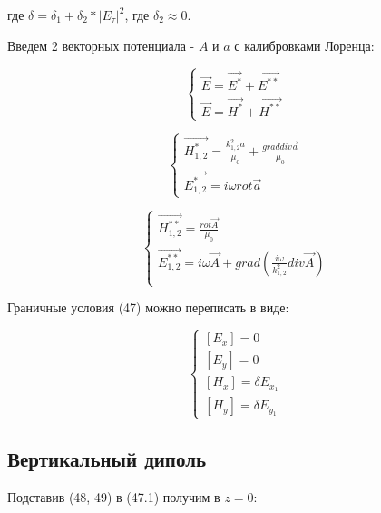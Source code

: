 	где $\delta = \delta_1 + \delta_2 * {|E_{\tau}|}^2$, где $\delta_2 \approx 0$.
	
	
	Введем 2 векторных потенциала - $A$ и $a$ с калибровками Лоренца:
	
	$$\begin{cases}
		\vec{E} = \vec{E^{*}} + \vec{E^{**}} \\
		\vec{E} = \vec{H^{*}} + \vec{H^{**}}
	\end{cases}$$
		
	\begin{equation}
		\begin{cases}
			\vec{H^*_{1, 2}} = \frac{k^2_{1, 2}a}{\mu_0} + \frac{grad div \vec{a}}{\mu_0}  \\
			\vec{E^*_{1, 2}} = i \omega rot \vec{a}
		\end{cases}
	\end{equation}
	
	\begin{equation}
		\begin{cases}
			\vec{H^{**}_{1, 2}} = \frac{rot \vec{A}}{\mu_0} \\
			\vec{E^{**}_{1, 2}} = i \omega \vec{A} + grad(\frac{i \omega}{k^2_{1, 2}} div \vec{A}) \\
		\end{cases}
	\end{equation}
	
	Граничные условия (47) можно переписать в виде:
	
	\begin{equation*}
		\tag{47.1}
		\begin{cases}
			[E_x] = 0 \\
			[E_y] = 0 \\
			[H_x] = \delta E_{x_1} \\
			[H_y] = \delta E_{y_1}
			
		\end{cases}
	\end{equation*}
	
	\subsection{Вертикальный диполь}
	
	Подставив (48, 49) в (47.1) получим в $z = 0$:
	
